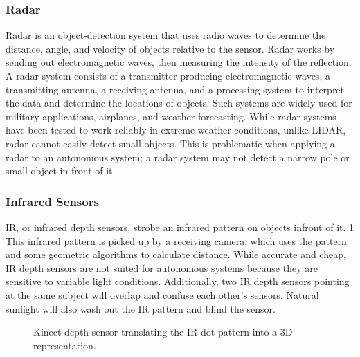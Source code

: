 \documentclass{article}
\begin{document}
    \subsubsection{Radar}
      Radar is an object-detection system that uses radio waves to determine the distance, angle, and velocity of objects relative to the sensor.
      Radar works by sending out electromagnetic waves, then measuring the intensity of the reflection. 
      A radar system consists of a transmitter producing electromagnetic waves, a transmitting antenna, a receiving antenna, and a processing system to interpret the data and determine the locations of objects.
      Such systems are widely used for military applications, airplanes, and weather forecasting.
      While radar systems have been tested to work reliably in extreme weather conditions, unlike LIDAR, radar cannot easily detect small objects. 
      This is problematic when applying a radar to an autonomous system; a radar system may not detect a narrow pole or small object in front of it.

    \subsubsection{Infrared Sensors}
      IR, or infrared depth sensors, strobe an infrared pattern on objects infront of it. \ref{fig:kinectIR}
      This infrared pattern is picked up by a receiving camera, which uses the pattern and some geometric algorithms to calculate distance.
      While accurate and cheap, IR depth sensors are not suited for autonomous systems because they are sensitive to variable light conditions.
      Additionally, two IR depth sensors pointing at the same subject will overlap and confuse each other’s sensors. 
      Natural sunlight will also wash out the IR pattern and blind the sensor.

      \begin{figure}[h]
        \centering
        \caption{ Kinect depth sensor translating the IR-dot pattern into a 3D representation. }
        \label{fig:kinectIR}
      \end{figure}
\end{document}

